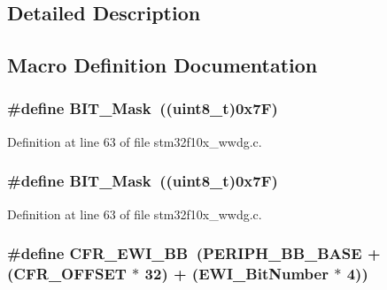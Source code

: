 \subsection{Detailed Description}


\subsection{Macro Definition Documentation}
\subsubsection[{\texorpdfstring{B\+I\+T\+\_\+\+Mask}{BIT_Mask}}]{\setlength{\rightskip}{0pt plus 5cm}\#define B\+I\+T\+\_\+\+Mask~(({\bf uint8\+\_\+t})0x7\+F)}\hypertarget{group___w_w_d_g___private___defines_ga01a4e07e98e933af78671f65a49bd836}{}\label{group___w_w_d_g___private___defines_ga01a4e07e98e933af78671f65a49bd836}


Definition at line 63 of file stm32f10x\+\_\+wwdg.\+c.

\subsubsection[{\texorpdfstring{B\+I\+T\+\_\+\+Mask}{BIT_Mask}}]{\setlength{\rightskip}{0pt plus 5cm}\#define B\+I\+T\+\_\+\+Mask~(({\bf uint8\+\_\+t})0x7\+F)}\hypertarget{group___w_w_d_g___private___defines_ga01a4e07e98e933af78671f65a49bd836}{}\label{group___w_w_d_g___private___defines_ga01a4e07e98e933af78671f65a49bd836}


Definition at line 63 of file stm32f10x\+\_\+wwdg.\+c.

\subsubsection[{\texorpdfstring{C\+F\+R\+\_\+\+E\+W\+I\+\_\+\+BB}{CFR_EWI_BB}}]{\setlength{\rightskip}{0pt plus 5cm}\#define C\+F\+R\+\_\+\+E\+W\+I\+\_\+\+BB~({\bf P\+E\+R\+I\+P\+H\+\_\+\+B\+B\+\_\+\+B\+A\+SE} + ({\bf C\+F\+R\+\_\+\+O\+F\+F\+S\+ET} $\ast$ 32) + ({\bf E\+W\+I\+\_\+\+Bit\+Number} $\ast$ 4))}\hypertarget{group___w_w_d_g___private___defines_gaa48804210cea547f0e0f4ca49c44fc94}{}\label{group___w_w_d_g___private___defines_gaa48804210cea547f0e0f4ca49c44fc94}


